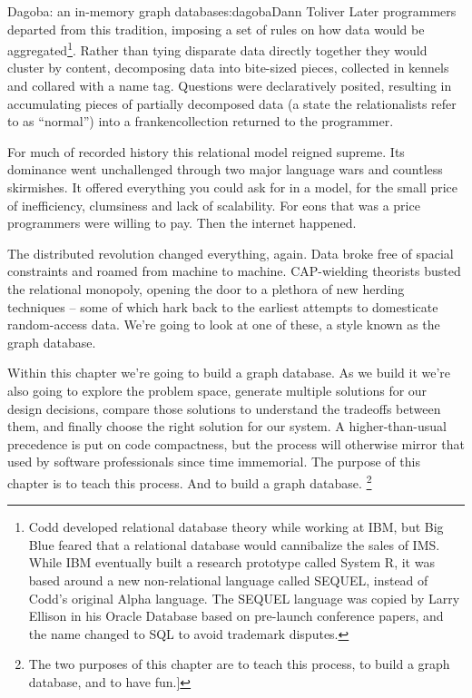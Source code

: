 \begin{aosachapter}{Dagoba: an in-memory graph database}{s:dagoba}{Dann Toliver}
Later programmers departed from this tradition, imposing a set of rules
on how data would be aggregated\footnote{Codd developed relational
  database theory while working at IBM, but Big Blue feared that a
  relational database would cannibalize the sales of IMS. While IBM
  eventually built a research prototype called System R, it was based
  around a new non-relational language called SEQUEL, instead of Codd's
  original Alpha language. The SEQUEL language was copied by Larry
  Ellison in his Oracle Database based on pre-launch conference papers,
  and the name changed to SQL to avoid trademark disputes.}. Rather than
tying disparate data directly together they would cluster by content,
decomposing data into bite-sized pieces, collected in kennels and
collared with a name tag. Questions were declaratively posited,
resulting in accumulating pieces of partially decomposed data (a state
the relationalists refer to as ``normal'') into a frankencollection
returned to the programmer.

For much of recorded history this relational model reigned supreme. Its
dominance went unchallenged through two major language wars and
countless skirmishes. It offered everything you could ask for in a
model, for the small price of inefficiency, clumsiness and lack of
scalability. For eons that was a price programmers were willing to pay.
Then the internet happened.

The distributed revolution changed everything, again. Data broke free of
spacial constraints and roamed from machine to machine. CAP-wielding
theorists busted the relational monopoly, opening the door to a plethora
of new herding techniques -- some of which hark back to the earliest
attempts to domesticate random-access data. We're going to look at one
of these, a style known as the graph database.

\label{take-one}

Within this chapter we're going to build a graph database. As we build
it we're also going to explore the problem space, generate multiple
solutions for our design decisions, compare those solutions to
understand the tradeoffs between them, and finally choose the right
solution for our system. A higher-than-usual precedence is put on code
compactness, but the process will otherwise mirror that used by software
professionals since time immemorial. The purpose of this chapter is to
teach this process. And to build a graph database. \footnote{The two
  purposes of this chapter are to teach this process, to build a graph
  database, and to have fun.{]}}


\end{aosachapter}
